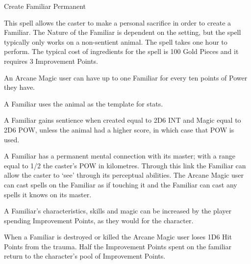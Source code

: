 \begin{rpg-spell}
{Create Familiar}
{Permanent}

This spell allows the caster to make a personal sacrifice in order to create a Familiar. The Nature of the Familiar is dependent on the setting, but the spell typically only works on a non-sentient animal. The spell takes one hour to perform. The typical cost of ingredients for the spell is 100 Gold Pieces and it requires 3 Improvement Points. 

\begin{rpg-list}
\item An Arcane Magic user can have up to one Familiar for every ten points of Power they have.
\item A Familiar uses the animal as the template for stats.
\item A Familiar gains sentience when created equal to 2D6 INT and Magic equal to 2D6 POW, unless the animal had a higher score, in which case that POW is used. 
\item A Familiar has a permanent mental connection with its master; with a range equal to 1/2 the caster’s POW in kilometres. Through this link the Familiar can allow the caster to ‘see’ through its perceptual abilities. The Arcane Magic user can cast spells on the Familiar as if touching it and the Familiar can cast any spells it knows on its master.
\item A Familiar's characteristics, skills and magic can be increased by the player spending Improvement Points, as they would for the character.
\item When a Familiar is destroyed or killed the Arcane Magic user loses 1D6 Hit Points from the trauma. Half the Improvement Points spent on the familiar return to the character's pool of Improvement Points.
\end{rpg-list}

\end{rpg-spell}


%
%
%
%
%


